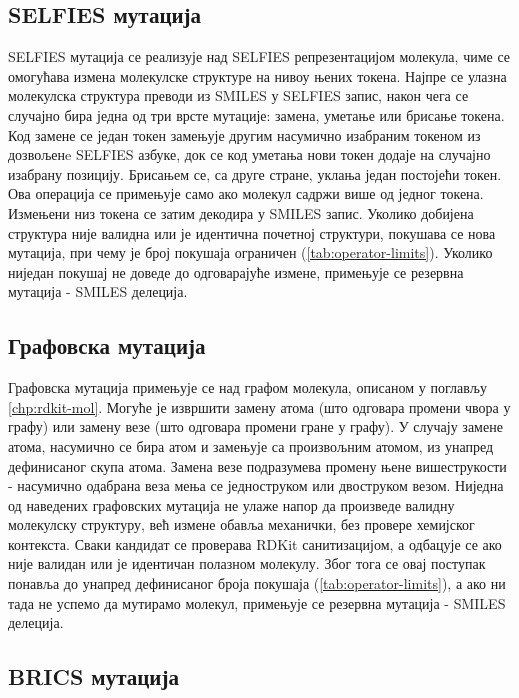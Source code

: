 \documentclass[12pt,oneside]{memoir}
\begin{document}
\subsection{SELFIES мутација}
\label{sec:selfies_mutation}

SELFIES мутација се реализује над SELFIES репрезентацијом 
молекула, чиме се омогућава измена молекулске структуре на 
нивоу њених токена. Најпре се улазна молекулска структура 
преводи из SMILES у SELFIES запис, након чега се случајно 
бира једна од три врсте мутације: замена, уметање или брисање 
токена. Код замене се један токен замењује другим насумично 
изабраним токеном из дозвољенe SELFIES азбуке, док се код 
уметања нови токен додаје на случајно изабрану позицију. 
Брисањем се, са друге стране, уклања један постојећи токен.
Ова операција се примењује само ако молекул садржи више од
једног токена.
Измењени низ токена се затим декодира у SMILES запис.
Уколико добијена структура није валидна или је идентична 
почетној структури, покушава се нова мутација, при чему је 
број покушаја ограничен (\ref{tab:operator-limits}). Уколико ниједан покушај не доведе 
до одговарајуће измене, примењује се резервна мутација - 
SMILES делеција.

\subsection{Графовска мутација}
\label{sec:graph_mutation}

Графовска мутација примењује се над графом молекула, описаном
у поглављу \ref{chp:rdkit-mol}. Могуће је извршити замену атома (што одговара 
промени чвора у графу) или замену везе (што одговара промени гране у графу).
У случају замене атома, насумично се бира атом и замењује са произвољним
атомом, из унапред дефинисаног скупа атома. Замена везе подразумева промену њене 
вишеструкости - насумично одабрана веза мења се једноструком или двоструком везом.
Ниједна од наведених графовских мутација не улаже напор да произведе валидну 
молекулску структуру, већ измене обавља механички, без провере хемијског 
контекста. Сваки кандидат се проверава RDKit санитизацијом, а одбацује се ако није валидан 
или је идентичан полазном молекулу.
Због тога се овај поступак понавља до унапред дефинисаног броја 
покушаја (\ref{tab:operator-limits}), а ако ни тада не успемо да мутирамо молекул, примењује се резервна мутација -
SMILES делеција.

\subsection{BRICS мутација}
\label{sec:brics_mutation}
\end{document}
